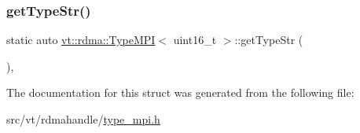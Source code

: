 \mbox{\label{structvt_1_1rdma_1_1_type_m_p_i_3_01uint16__t_01_4_a52d04b9bfcf4d5b442f3414c0fd9987c}} 
\subsubsection{\texorpdfstring{get\+Type\+Str()}{getTypeStr()}}
{\footnotesize\ttfamily static auto \hyperlink{structvt_1_1rdma_1_1_type_m_p_i}{vt\+::rdma\+::\+Type\+M\+PI}$<$ uint16\+\_\+t $>$\+::get\+Type\+Str (\begin{DoxyParamCaption}{ }\end{DoxyParamCaption})\hspace{0.3cm}{\ttfamily [inline]}, {\ttfamily [static]}}



The documentation for this struct was generated from the following file\+:\begin{DoxyCompactItemize}
\item 
src/vt/rdmahandle/\hyperlink{type__mpi_8h}{type\+\_\+mpi.\+h}\end{DoxyCompactItemize}
